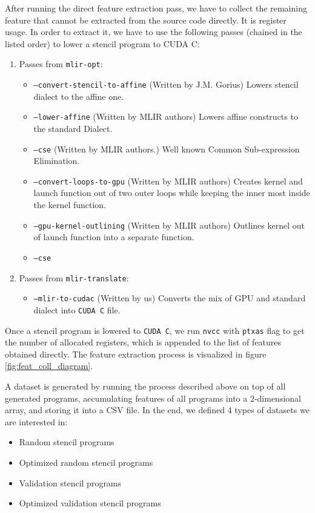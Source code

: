 \documentclass[sigplan,\review anonymous]{acmart}
\begin{document}
After running the direct feature extraction pass, we have to collect the
remaining feature that cannot be extracted from the source code directly. It
is register usage. In order to extract it, we have to use the following passes
(chained in the listed order) to lower a stencil program to CUDA C:
\begin{enumerate}
  \item Passes from \texttt{mlir-opt}:
  \begin{itemize}
    \item \texttt{--convert-stencil-to-affine} (Written by J.M. Gorius) 
    Lowers stencil dialect to the affine one. 
    \item \texttt{--lower-affine} (Written by MLIR authors) Lowers affine
    constructs to the standard Dialect.
    \item \texttt{--cse} (Written by MLIR authors.) Well known Common
    Sub-expression Elimination.
    \item \texttt{--convert-loops-to-gpu} (Written by MLIR authors) Creates
    kernel and launch function out of two outer loops while keeping the inner
    most inside the kernel function.
    \item \texttt{--gpu-kernel-outlining} (Written by MLIR authors) Outlines
    kernel out of launch function into a separate function.
    \item \texttt{--cse}
  \end{itemize}
  \item Passes from \texttt{mlir-translate}:
  \begin{itemize}
    \item \texttt{--mlir-to-cudac} (Written by us) Converts the mix of GPU
    and standard dialect into \texttt{CUDA C} file. 
  \end{itemize}
\end{enumerate}

Once a stencil program is lowered to \texttt{CUDA C}, we run \texttt{nvcc}
with \texttt{ptxas} flag to get the number of allocated registers, which is
appended to the list of features obtained directly. The feature extraction
process is visualized in figure \ref{fig:feat_coll_diagram}. 

A dataset is generated by running the process described above on top of all
generated programs, accumulating features of all programs into a 2-dimensional
array, and storing it into a CSV file. In the end, we defined 4 types of
datasets we are interested in:

\begin{itemize}
  \item Random stencil programs
  \item Optimized random stencil programs
  \item Validation stencil programs
  \item Optimized validation stencil programs
\end{itemize}
\end{document}
